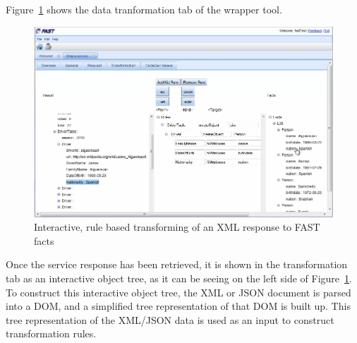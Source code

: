 \documentclass{fast_latex}
\begin{document}
{Figure~\ref{fig:response_service_execution} shows the data tranformation tab of the wrapper tool. 

\begin{figure}
  \begin{center}
      \includegraphics[angle=90,width=0.8\linewidth]{images/ServiceWrapperToolGVSWithTransformationRulesF1.png}
    \caption{Interactive, rule based transforming of an XML response to FAST facts}
    \label{fig:response_service_execution}
  \end{center}
\end{figure}

Once the service response has been retrieved, it is shown in the transformation tab as an interactive object tree, as it can be seeing on the left side of Figure~\ref{fig:response_service_execution}. To construct this interactive object tree, the XML or JSON document is parsed into a DOM, and a simplified tree representation of that DOM is built up. This tree representation of the XML/JSON data is used as an input to construct transformation rules.

}
\end{document}

